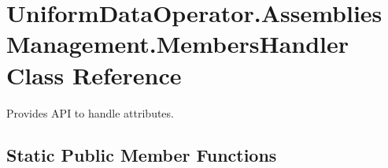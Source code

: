 \hypertarget{class_uniform_data_operator_1_1_assemblies_management_1_1_members_handler}{}\section{Uniform\+Data\+Operator.\+Assemblies\+Management.\+Members\+Handler Class Reference}
\label{class_uniform_data_operator_1_1_assemblies_management_1_1_members_handler}


Provides A\+PI to handle attributes.  


\subsection*{Static Public Member Functions}
